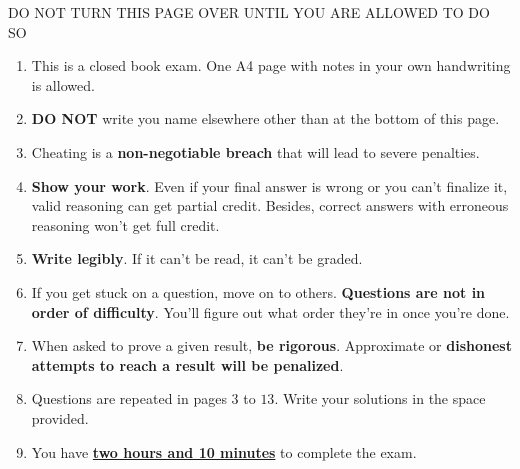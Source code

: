 \documentclass[article,12pt,a4paper]{article}
\begin{document}
	
	
	
	
	\newpage
	
	
	
	
	\maketitle
	
	\begin{center}
		\huge{	DO NOT TURN THIS PAGE OVER UNTIL YOU ARE ALLOWED TO DO SO}
	\end{center}
	
	\thispagestyle{empty} 
	\bigskip
	
	\begin{enumerate}
		\item This is a closed book exam. 
		One A4 page with notes in your own handwriting is allowed.
		\item \textbf{DO NOT} write you name elsewhere other than at the bottom of this page.
		\item Cheating is a \textbf{non-negotiable breach} that will lead to severe penalties.	
		\item \textbf{Show your work}. Even if your final answer is wrong or you can't finalize it, valid reasoning can get partial credit. 
		Besides, correct answers with erroneous reasoning won't get full credit.
		\item \textbf{Write legibly}. If it can't be read, it can't be graded.
		\item If you get stuck on a question, move on to others. 
		\textbf{Questions are not in order of difficulty}.
		You'll figure out what order they're in once you're done.
		\item When asked to prove a given result, \textbf{be rigorous}. Approximate or \textbf{dishonest attempts to reach a result will be penalized}.
		
		\item Questions are repeated in pages $3$ to $13$. Write your solutions in the space provided.
		\item You have \underline{\textbf{two hours and 10 minutes}} to complete the exam.
	\end{enumerate}
	
\end{document}
